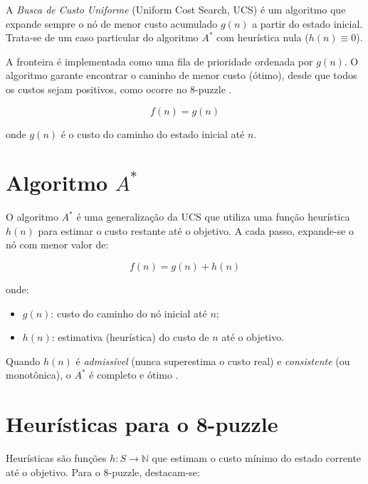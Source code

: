 A \emph{Busca de Custo Uniforme} (Uniform Cost Search, UCS) é um algoritmo que expande sempre o nó de menor custo acumulado $g(n)$ a partir do estado inicial. Trata-se de um caso particular do algoritmo $A^*$ com heurística nula ($h(n) \equiv 0$).  
  
A fronteira é implementada como uma fila de prioridade ordenada por $g(n)$. O algoritmo garante encontrar o caminho de menor custo (ótimo), desde que todos os custos sejam positivos, como ocorre no 8-puzzle \cite{russell2010artificial}.  
  
\begin{equation}  
    f(n) = g(n)  
\end{equation}  
  
\noindent  
onde $g(n)$ é o custo do caminho do estado inicial até $n$.  
  
\section{Algoritmo $A^*$}  
  
O algoritmo $A^*$ é uma generalização da UCS que utiliza uma função heurística $h(n)$ para estimar o custo restante até o objetivo. A cada passo, expande-se o nó com menor valor de:  
  
\begin{equation}  
    f(n) = g(n) + h(n)  
\end{equation}  
  
\noindent  
onde:  
\begin{itemize}  
    \item $g(n)$: custo do caminho do nó inicial até $n$;  
    \item $h(n)$: estimativa (heurística) do custo de $n$ até o objetivo.  
\end{itemize}  
  
Quando $h(n)$ é \emph{admissível} (nunca superestima o custo real) e \emph{consistente} (ou monotônica), o $A^*$ é completo e ótimo \cite{russell2010artificial,nilsson1998,ertel2017}.  
  
\section{Heurísticas para o 8-puzzle}  
  
Heurísticas são funções $h: S \to \mathbb{N}$ que estimam o custo mínimo do estado corrente até o objetivo. Para o 8-puzzle, destacam-se:  
  
